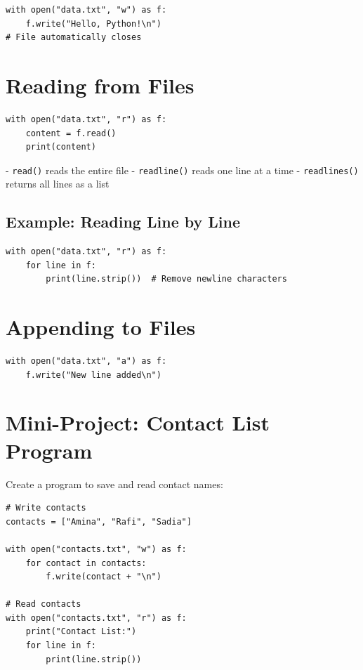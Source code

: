 \begin{verbatim}
with open("data.txt", "w") as f:
    f.write("Hello, Python!\n")
# File automatically closes
\end{verbatim}

\section{Reading from Files}

\begin{verbatim}
with open("data.txt", "r") as f:
    content = f.read()
    print(content)
\end{verbatim}

- \texttt{read()} reads the entire file  
- \texttt{readline()} reads one line at a time  
- \texttt{readlines()} returns all lines as a list  

\subsection{Example: Reading Line by Line}

\begin{verbatim}
with open("data.txt", "r") as f:
    for line in f:
        print(line.strip())  # Remove newline characters
\end{verbatim}

\section{Appending to Files}

\begin{verbatim}
with open("data.txt", "a") as f:
    f.write("New line added\n")
\end{verbatim}

\section{Mini-Project: Contact List Program}

Create a program to save and read contact names:

\begin{verbatim}
# Write contacts
contacts = ["Amina", "Rafi", "Sadia"]

with open("contacts.txt", "w") as f:
    for contact in contacts:
        f.write(contact + "\n")

# Read contacts
with open("contacts.txt", "r") as f:
    print("Contact List:")
    for line in f:
        print(line.strip())
\end{verbatim}

